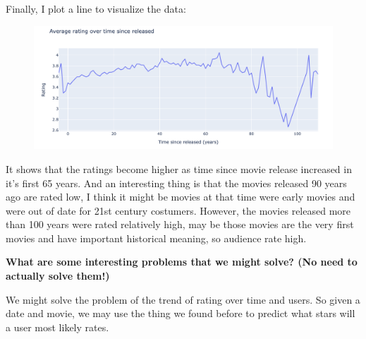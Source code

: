 \documentclass{article}
\begin{document}
\begin{enumerate}
\begin{figure}[H]
\end{figure}
Finally, I plot a line to visualize the data\(:\)
\begin{figure}[H]
\centering
\includegraphics[width=18cm]{images/rating over time sine release.png}
\end{figure}
{
It shows that the ratings become higher as time since movie release increased in it's first 65 years. And an interesting thing is that the movies released 90 years ago are rated low, I think it might be movies at that time were early movies and were out of date for 21st century costumers. However, the movies released more than 100 years were rated relatively high, may be those movies are the very first movies and have important historical meaning, so audience rate high.
}
{
\linespread{2.0} \selectfont
\item \textbf {What are some interesting problems that we might solve? (No need to actually solve them!)}
}

{
\linespread{2.0} \selectfont
We might solve the problem of the trend of rating over time and users. So given a date and movie, we may use the thing we found before to predict what stars will a user most likely rates.
}
  
\end{enumerate}
\end{document}

